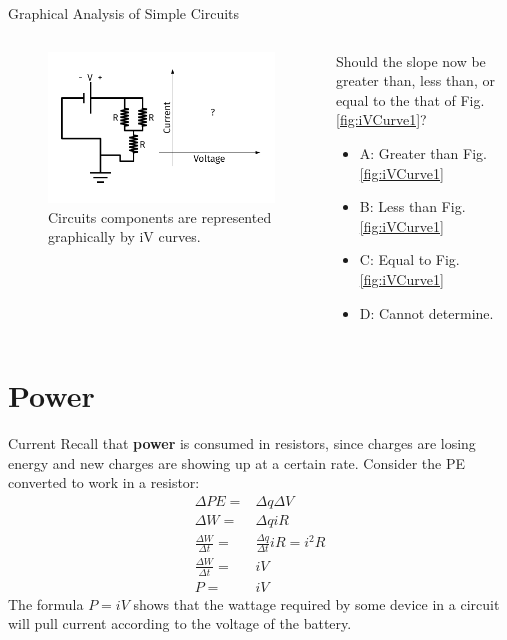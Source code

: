 \documentclass{beamer}
\begin{document}
\begin{frame}{Graphical Analysis of Simple Circuits}
\begin{columns}[T]
\begin{column}{0.5\textwidth}
\begin{figure}
\centering
\includegraphics[width=\textwidth,trim=0.5cm 0cm 1cm 0cm,clip=true]{figures/iVCurve4.pdf}
\caption{\label{fig:iVCurve4} Circuits components are represented graphically by iV curves.}
\end{figure}
\end{column}
\begin{column}{0.5\textwidth}
\small
Should the slope now be greater than, less than, or equal to the that of Fig. \ref{fig:iVCurve1}?
\begin{itemize}
\item A: Greater than Fig. \ref{fig:iVCurve1}
\item B: Less than Fig. \ref{fig:iVCurve1}
\item C: Equal to Fig. \ref{fig:iVCurve1}
\item D: Cannot determine.
\end{itemize}
\end{column}
\end{columns}
\end{frame}

\section{Power}

\begin{frame}{Current}
Recall that \textbf{power} is consumed in resistors, since charges are losing energy and new charges are showing up at a certain rate.  Consider the PE converted to work in a resistor:
\begin{align}
\Delta PE =& \Delta q\Delta V \\
\Delta W =& \Delta q i R \\
\frac{\Delta W}{\Delta t} =& \frac{\Delta q}{\Delta t} i R = i^2 R \\
\frac{\Delta W}{\Delta t} =& i V \\
P =& iV
\end{align}
The formula $P = iV$ shows that the wattage required by some device in a circuit will pull current according to the voltage of the battery.
\end{frame}
\end{document}
